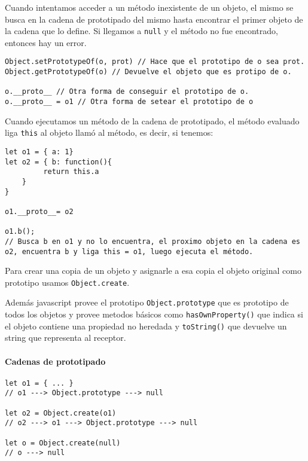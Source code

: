 Cuando intentamos acceder a un método inexistente de un objeto, el mismo se busca en la cadena de prototipado del mismo hasta encontrar el primer objeto de la cadena que lo define. Si llegamos a \texttt{null} y el método no fue encontrado, entonces hay un error.

\begin{centrado}
\begin{verbatim}
Object.setPrototypeOf(o, prot) // Hace que el prototipo de o sea prot.
Object.getPrototypeOf(o) // Devuelve el objeto que es protipo de o.

o.__proto__ // Otra forma de conseguir el prototipo de o.
o.__proto__ = o1 // Otra forma de setear el prototipo de o
\end{verbatim}
\end{centrado}

Cuando ejecutamos un método de la cadena de prototipado, el método evaluado liga \texttt{this} al objeto llamó al método, es decir, si tenemos:

\begin{centrado}
\begin{verbatim}
let o1 = { a: 1}
let o2 = { b: function(){
         return this.a
    }
}

o1.__proto__= o2

o1.b();
// Busca b en o1 y no lo encuentra, el proximo objeto en la cadena es o2, encuentra b y liga this = o1, luego ejecuta el método.
\end{verbatim}
\end{centrado}

Para crear una copia de un objeto y asignarle a esa copia el objeto original como prototipo usamos \texttt{Object.create}.

Además javascript provee el prototipo \texttt{Object.prototype} que es prototipo de todos los objetos y provee metodos básicos como \texttt{hasOwnProperty()} que indica si el objeto contiene una propiedad no heredada y \texttt{toString()} que devuelve un string que representa al receptor.

\paragraph{Cadenas de prototipado}

\begin{centrado}
\begin{verbatim}
let o1 = { ... }
// o1 ---> Object.prototype ---> null

let o2 = Object.create(o1)
// o2 ---> o1 ---> Object.prototype ---> null

let o = Object.create(null)
// o ---> null
\end{verbatim}
\end{centrado}

